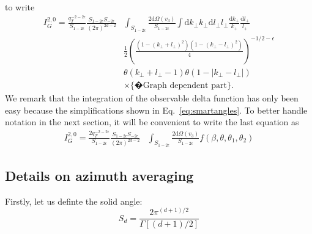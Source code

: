 \documentclass[a4paper,11pt]{article}
\numberwithin{equation}{section}
\newcommand{\dd}{\text{d}}
\newcommand{\eps}{\epsilon}
\begin{document}
%
to write 
\begin{align}
I_G^{2,0}=   \frac{q_T^{-2-2\eps}}{S_{1-2\eps}} 
\frac{ S_{1-2\eps}   S_{-2\eps}}{(2\pi)^{2d-2}}    
&\int_{S_{1-2\epsilon}} \frac{2\dd\Omega(v_3)}{S_{1-2\eps}} 
\int 
 \dd k_\perp k_\perp \dd l_\perp l_\perp  \frac{\dd k_+} {k_+}\frac{\dd l_+}{l_+}   
\nonumber\\
	   &\frac{1}{2}\left(
            \frac{(1-(k_\perp+l_\perp)^2)(1-(k_\perp-l_\perp)^2)}{4}
            \right)^{-1/2-\epsilon}\nonumber\\
            &\theta(k_\perp+l_\perp-1) \theta(1-|k_\perp-l_\perp|) \nonumber\\
&\times \{�\text{Graph dependent part} \} . 
\end{align}
We remark that the integration of the observable delta function has only been easy because the simplifications shown in Eq.~\eqref{eq:smartangles}. To better handle notation in the next section, it will be convenient to write the last equation as
\begin{align}
I_G^{2,0}=   \frac{2 q_T^{-2-2\eps}}{S_{1-2\eps}} 
\frac{ S_{1-2\eps}   S_{-2\eps}}{(2\pi)^{2d-2}}    
&\int_{S_{1-2\epsilon}} \frac{2\dd\Omega(v_3)}{S_{1-2\eps}} 
f (\beta,\theta,\theta_1,\theta_2)\label{eq:anygraph}
\end{align}

\subsection{Details on azimuth averaging}
Firstly, let us definte the solid angle:
\begin{equation}
S_{d}= \frac{2\pi^{(d+1)/2}}{\Gamma[(d+1)/2]}
\end{equation}
\end{document}
